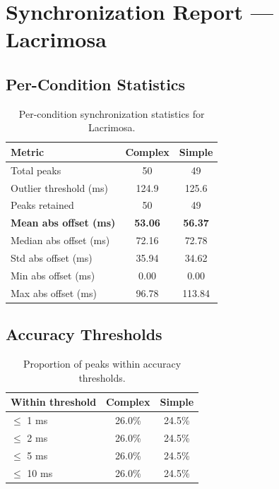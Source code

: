 
\section*{Synchronization Report --- Lacrimosa}

\subsection*{Per-Condition Statistics}

\begin{table}[h!]
\centering
\begin{tabular}{|l|c|c|}
\hline
Metric & Complex & Simple \\
\hline
Total peaks & 50 & 49 \\
Outlier threshold (ms) & 124.9 & 125.6 \\
Peaks retained & 50 & 49 \\
\textbf{Mean abs offset (ms)} & \textbf{53.06} & \textbf{56.37} \\
Median abs offset (ms) & 72.16 & 72.78 \\
Std abs offset (ms) & 35.94 & 34.62 \\
Min abs offset (ms) & 0.00 & 0.00 \\
Max abs offset (ms) & 96.78 & 113.84 \\
\hline
\end{tabular}
\caption{Per-condition synchronization statistics for Lacrimosa.}
\label{tab:sync_stats}
\end{table}

\subsection*{Accuracy Thresholds}

\begin{table}[h!]
\centering
\begin{tabular}{|l|c|c|}
\hline
Within threshold & Complex & Simple \\
\hline
$\leq$ 1 ms & 26.0\% & 24.5\% \\
$\leq$ 2 ms & 26.0\% & 24.5\% \\
$\leq$ 5 ms & 26.0\% & 24.5\% \\
$\leq$ 10 ms & 26.0\% & 24.5\% \\
\hline
\end{tabular}
\caption{Proportion of peaks within accuracy thresholds.}
\label{tab:sync_accuracy}
\end{table}

